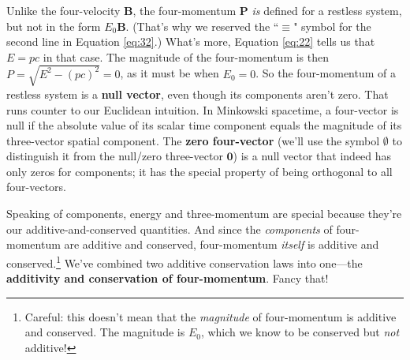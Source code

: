 \documentclass[12pt]{article}
\renewcommand{\vv}[1]{\mathbf{#1}}
\begin{document}
Unlike the four-velocity $\vv B$, the four-momentum $\vv P$ \emph{is} defined for a restless system, but not in the form $E_0 \vv B$. (That's why we reserved the ``$\equiv$" symbol for the second line in Equation \ref{eq:32}.) What's more, Equation \ref{eq:22} tells us that $E=p c$ in that case. The magnitude of the four-momentum is then $P = \sqrt{E^2 - (p c)^2} = 0$, as it must be when $E_0 = 0$. So the four-momentum of a restless system is a \textbf{null vector}, even though its components aren't zero. That runs counter to our Euclidean intuition. In Minkowski spacetime, a four-vector is null if the absolute value of its scalar time component equals the magnitude of its three-vector spatial component. The \textbf{zero four-vector} (we'll use the symbol \mbox{\boldmath$\emptyset$} to distinguish it from the null/zero three-vector $\vv 0$) is a null vector that indeed has only zeros for components; it has the special property of being orthogonal to all four-vectors.

Speaking of components, energy and three-momentum are special because they're our additive-and-conserved quantities. And since the \emph{components} of four-momentum are additive and conserved, four-momentum \emph{itself} is additive and conserved.\footnote{Careful: this doesn't mean that the \emph{magnitude} of four-momentum is additive and conserved. The magnitude is $E_0$, which we know to be conserved but \emph{not} additive!} We've combined two additive conservation laws into one---the \textbf{additivity and conservation of four-momentum}. Fancy that!
\end{document}
